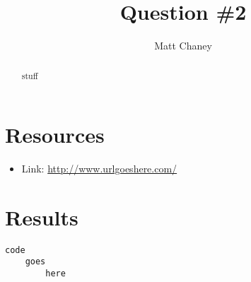 \documentclass[10pt,letterpaper]{article}
\begin{document}
\lstset{language=Python, basicstyle=\small}

\title{Question \#2}
\author{Matt Chaney}

\maketitle

\begin{abstract}
stuff
\end{abstract}

\section{Resources}
\begin{itemize}
\item Link: \url{http://www.urlgoeshere.com/}

\end{itemize}

\section{Results}
\begin{lstlisting}
code
	goes
		here
\end{lstlisting}
\end{document}
